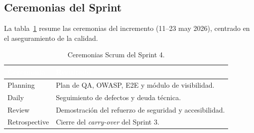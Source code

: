 \subsection{Ceremonias del Sprint}
\label{ssec:s4_ceremonias}
La tabla~\ref{tab:s4_ceremonias} resume las ceremonias del incremento (11--23 may 2026), centrado
en el aseguramiento de la calidad.

\clearpage
\begin{table}[!ht]
    \centering
    \renewcommand{\arraystretch}{1.3}
    \fontsize{9}{10.8}\selectfont\sffamily
    \begin{tabularx}{\textwidth}{|l|X|}
        \hline
        \rowcolor{colorPrimario}
        \textcolor{white}{\textbf{Ceremonia}} & \textcolor{white}{\textbf{Resultado}} \\ \hline
        Planning & Plan de QA, OWASP, E2E y módulo de visibilidad. \\ \hline
        \rowcolor{grisTecnico}
        Daily & Seguimiento de defectos y deuda técnica. \\ \hline
        Review & Demostración del refuerzo de seguridad y accesibilidad. \\ \hline
        \rowcolor{grisTecnico}
        Retrospective & Cierre del \textit{carry-over} del Sprint 3. \\ \hline
    \end{tabularx}
    \caption{Ceremonias Scrum del Sprint 4.}
    \label{tab:s4_ceremonias}
\end{table}

\clearpage
